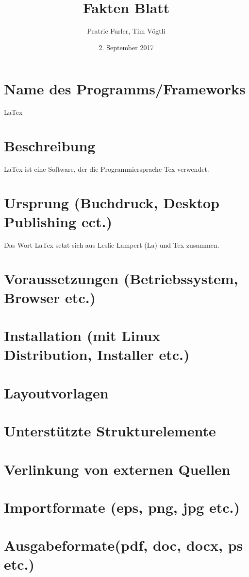 \documentclass{scrartcl}
\title{Fakten Blatt}
\author{Pratric Furler, Tim Vögtli}
\date{2. September 2017}
\begin{document}
\maketitle

\section{Name des Programms/Frameworks}
LaTex
\section{Beschreibung}
LaTex ist eine Software, der die Programmiersprache Tex verwendet.
\section{Ursprung (Buchdruck, Desktop Publishing ect.)}
Das Wort LaTex setzt sich aus Leslie Lampert (La) und Tex zusammen.

\section{Voraussetzungen (Betriebssystem, Browser etc.)}

\section{Installation (mit Linux Distribution, Installer etc.)}

\section{Layoutvorlagen}

\section{Unterstützte Strukturelemente}

\section{Verlinkung von externen Quellen}

\section{Importformate (eps, png, jpg etc.)}

\section{Ausgabeformate(pdf, doc, docx, ps etc.)}
\end{document}
